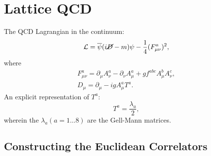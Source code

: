 \chapter{Lattice QCD}

The QCD Lagrangian in the continuum:
\begin{equation}
    \mathcal{L}=\overline{\psi}(i\cancel{D}-m)\psi - \frac{1}{4}(F^a_{\mu\nu})^2,
\end{equation}
where
\begin{gather}
    F^a_{\mu\nu}=\partial_\mu A_\nu^a - \partial_\nu A_\mu^a + gf^{abc}A_\mu^b A_\nu^c, \\
    D_\mu = \partial_\mu - ig A_\mu^aT^a.
\end{gather}
An explicit representation of $T^a$: 
\begin{equation}
    T^a = \frac{\lambda_a}{2},
\end{equation}
wherein the $\lambda_a(a=1\dots 8)$ are the Gell-Mann matrices.

\section{Constructing the Euclidean Correlators}